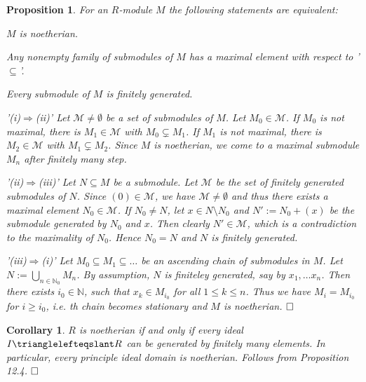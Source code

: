 \documentclass[11pt]{book}
\newtheorem{proposition}[theorem]{Proposition}
\newtheorem{corollary}[theorem]{Corollary}
\theoremstyle{nonumberbreak}
\newenvironment{pr}[1][]{\ifthenelse{\equal{#1}{}}{\proof}{\proof[#1]}\rm}{\endproof}
\begin{document}
\begin{spacing}{1.3}
\begin{proposition} %
For an $R$-module $M$ the following statements are equivalent:
\begin{compactenum}
\item $M$ is noetherian.
\item Any nonempty family of submodules of $M$ has a maximal element with respect to '$\subseteq$'.
\item Every submodule of $M$ is finitely generated.
\end{compactenum}
\begin{pr}
\begin{compactenum}
\item['(i)$\Rightarrow$(ii)'] Let $\mathcal{M} \neq \emptyset$ be a set of submodules of $M$. Let $M_0 \in \mathcal{M}$. If $M_0$ is not maximal, there is $M_1 \in \mathcal{M}$ with $M_0 \subsetneq M_1$. If $M_1$ is not maximal, there is $M_2 \in \mathcal{M}$ with $M_1 \subsetneq M_2$. Since $M$ is noetherian, we come to a maximal submodule $M_n$ after finitely many step.
\item['(ii)$\Rightarrow$(iii)'] Let $N \subseteq M$ be a submodule. Let $\mathcal{M}$ be the set of finitely generated submodules of $N$. Since $( 0 ) \in \mathcal{M}$, we have $\mathcal{M} \neq \emptyset$ and thus there exists a maximal element $N_0 \in \mathcal{M}$. If $N_0 \neq N$, let $x \in N \setminus N_0$ and $N':=N_0 + ( x ) $ be the submodule generated by $N_0$ and $x$. Then clearly $N' \in \mathcal{M}$, which is a contradiction to the maximality of $N_0$. Hence $N_0=N$ and $N$ is finitely generated. 
\item['(iii)$\Rightarrow$(i)'] Let $M_0 \subseteq M_1 \subseteq \ldots$ be an ascending chain of submodules in $M$. Let $N:= \bigcup_{n \in \mathbb{N}_0} M_n$. By assumption, $N$ is finiteley generated, say by $x_1, \ldots x_n$. Then there exists $i_0 \in \mathbb{N}$, such that $x_k \in M_{i_0}$ for all $1 \leqslant k \leqslant n$. Thus we have $M_i=M_{i_0}$ for $i \geqslant i_0$, i.e. th chain becomes stationary and $M$ is noetherian. $\hfill \Box$
\end{compactenum}
\end{pr}
\end{proposition}

\begin{corollary} %
$R$ is noetherian if and only if every ideal $I \trianglelefteqslant R$ can be generated by finitely many elements. In particular, every principle ideal domain is noetherian.
\begin{pr}
Follows from Proposition 12.4. $\hfill \Box$
\end{pr}
\end{corollary}


\end{spacing}
\end{document}
